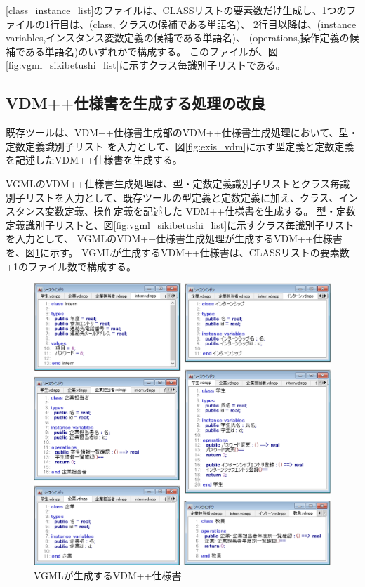 \ref{class_instance_list}のファイルは、CLASSリストの要素数だけ生成し、1つのファイルの1行目は、(class, クラスの候補である単語名)、
2行目以降は、(instance variables,インスタンス変数定義の候補である単語名)、 (operations,操作定義の候補である単語名)のいずれかで構成する。
このファイルが、図\ref{fig:vgml_sikibetushi_list}に示すクラス毎識別子リストである。

\subsection{VDM++仕様書を生成する処理の改良}
既存ツールは、VDM++仕様書生成部のVDM++仕様書生成処理において、型・定数定義識別子リスト
を入力として、図\ref{fig:exis_vdm}に示す型定義と定数定義を記述したVDM++仕様書を生成する。

VGMLのVDM++仕様書生成処理は、型・定数定義識別子リストとクラス毎識別子リストを入力として、既存ツールの型定義と定数定義に加え、クラス、インスタンス変数定義、操作定義を記述した
VDM++仕様書を生成する。
型・定数定義識別子リストと、図\ref{fig:vgml_sikibetushi_list}に示すクラス毎識別子リストを入力として、
VGMLのVDM++仕様書生成処理が生成するVDM++仕様書を、図\ref{fig:4_vdm}に示す。
VGMLが生成するVDM++仕様書は、CLASSリストの要素数+1のファイル数で構成する。

\begin{figure}[p]
    \begin{center}
        \includegraphics[width=1.0\columnwidth]{image/4_vdm.png}
        \caption{VGMLが生成するVDM++仕様書}
        \label{fig:4_vdm}
    \end{center}
\end{figure}

